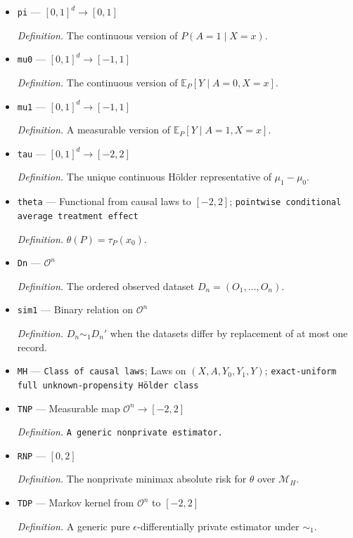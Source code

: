 \documentclass{article}
\begin{document}
\begin{itemize}
  \item \texttt{pi} --- \([0,1]^d\to[0,1]\)
  \par\smallskip\noindent\emph{Definition.} The continuous version of \(P(A=1\mid X=x)\).
  \item \texttt{mu0} --- \([0,1]^d\to[-1,1]\)
  \par\smallskip\noindent\emph{Definition.} The continuous version of \(\mathbb E_P[Y\mid A=0,X=x]\).
  \item \texttt{mu1} --- \([0,1]^d\to[-1,1]\)
  \par\smallskip\noindent\emph{Definition.} A measurable version of \(\mathbb E_P[Y\mid A=1,X=x]\).
  \item \texttt{tau} --- \([0,1]^d\to[-2,2]\)
  \par\smallskip\noindent\emph{Definition.} The unique continuous Hölder representative of \(\mu_1-\mu_0\).
  \item \texttt{theta} --- Functional from causal laws to \([-2,2]\); \texttt{pointwise conditional average treatment effect}
  \par\smallskip\noindent\emph{Definition.} \(\theta(P)=\tau_P(x_0)\).
  \item \texttt{Dn} --- \(\mathcal O^n\)
  \par\smallskip\noindent\emph{Definition.} The ordered observed dataset \(D_n=(O_1,\ldots,O_n)\).
  \item \texttt{sim1} --- Binary relation on \(\mathcal O^n\)
  \par\smallskip\noindent\emph{Definition.} \(D_n\sim_1D_n'\) when the datasets differ by replacement of at most one record.
  \item \texttt{MH} --- \texttt{Class of causal laws}; Laws on \((X,A,Y_0,Y_1,Y)\); \texttt{exact-\allowbreak{}uniform full unknown-\allowbreak{}propensity Hölder class}
  \item \texttt{TNP} --- Measurable map \(\mathcal O^n\to[-2,2]\)
  \par\smallskip\noindent\emph{Definition.} \texttt{A generic nonprivate estimator.}
  \item \texttt{RNP} --- \([0,2]\)
  \par\smallskip\noindent\emph{Definition.} The nonprivate minimax absolute risk for \(\theta\) over \(\mathcal M_H\).
  \item \texttt{TDP} --- Markov kernel from \(\mathcal O^n\) to \([-2,2]\)
  \par\smallskip\noindent\emph{Definition.} A generic pure \(\epsilon\)-differentially private estimator under \(\sim_1\).

\end{itemize}
\end{document}
